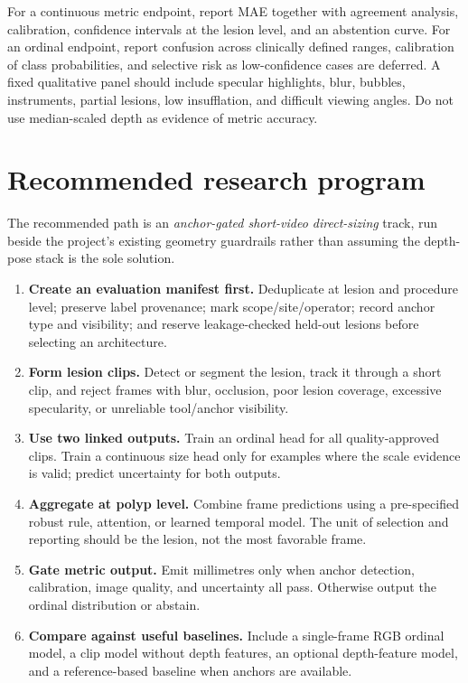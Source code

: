 \documentclass[11pt]{article}
\begin{document}
For a continuous metric endpoint, report MAE together with agreement analysis,
calibration, confidence intervals at the lesion level, and an abstention curve.
For an ordinal endpoint, report confusion across clinically defined ranges,
calibration of class probabilities, and selective risk as low-confidence cases
are deferred. A fixed qualitative panel should include specular highlights,
blur, bubbles, instruments, partial lesions, low insufflation, and difficult
viewing angles. Do not use median-scaled depth as evidence of metric accuracy.

\section{Recommended research program}

The recommended path is an \emph{anchor-gated short-video direct-sizing}
track, run beside the project’s existing geometry guardrails rather than
assuming the depth-pose stack is the sole solution.

\begin{enumerate}[leftmargin=*]
  \item \textbf{Create an evaluation manifest first.} Deduplicate at lesion
  and procedure level; preserve label provenance; mark scope/site/operator;
  record anchor type and visibility; and reserve leakage-checked held-out
  lesions before selecting an architecture.
  \item \textbf{Form lesion clips.} Detect or segment the lesion, track it
  through a short clip, and reject frames with blur, occlusion, poor lesion
  coverage, excessive specularity, or unreliable tool/anchor visibility.
  \item \textbf{Use two linked outputs.} Train an ordinal head for all
  quality-approved clips. Train a continuous size head only for examples where
  the scale evidence is valid; predict uncertainty for both outputs.
  \item \textbf{Aggregate at polyp level.} Combine frame predictions using a
  pre-specified robust rule, attention, or learned temporal model. The unit of
  selection and reporting should be the lesion, not the most favorable frame.
  \item \textbf{Gate metric output.} Emit millimetres only when anchor
  detection, calibration, image quality, and uncertainty all pass. Otherwise
  output the ordinal distribution or abstain.
  \item \textbf{Compare against useful baselines.} Include a single-frame RGB
  ordinal model, a clip model without depth features, an optional depth-feature
  model, and a reference-based baseline when anchors are available.
\end{enumerate}
\end{document}
